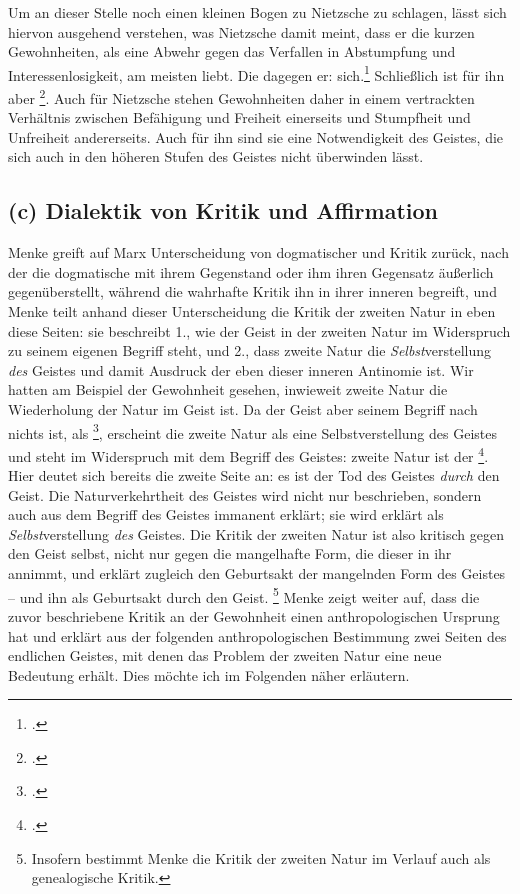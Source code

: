 \documentclass[12pt, a4paper, openany]{report}
\begin{document}
Um an dieser Stelle noch einen kleinen Bogen zu Nietzsche zu schlagen, lässt sich hiervon ausgehend verstehen, was Nietzsche damit meint, dass er die kurzen Gewohnheiten, als eine Abwehr gegen das Verfallen in Abstumpfung und Interessenlosigkeit, am meisten liebt.
Die  dagegen  er:  sich.\footcite[][535]{nietzsche_morgenrote_1999}
Schließlich ist für ihn  aber \footcite[][535]{nietzsche_morgenrote_1999}.
Auch für Nietzsche stehen Gewohnheiten daher in einem vertrackten Verhältnis zwischen Befähigung und Freiheit einerseits und Stumpfheit und Unfreiheit andererseits. 
Auch für ihn sind sie eine Notwendigkeit des Geistes, die sich auch in den höheren Stufen des Geistes nicht überwinden lässt. 

\subsection{(c) Dialektik von Kritik und Affirmation}\label{kritik_affirmation}
Menke greift auf Marx Unterscheidung von dogmatischer und  Kritik zurück, nach der die dogmatische mit ihrem Gegenstand  oder ihm ihren Gegensatz äußerlich gegenüberstellt, während die wahrhafte Kritik ihn in ihrer inneren  begreift, und Menke teilt anhand dieser Unterscheidung die Kritik der zweiten Natur in eben diese Seiten:
sie beschreibt 1., wie der Geist in der zweiten Natur im Widerspruch zu seinem eigenen Begriff steht, und 2., dass zweite Natur die \emph{Selbst}verstellung \emph{des} Geistes und damit Ausdruck der eben dieser inneren Antinomie ist.
Wir hatten am Beispiel der Gewohnheit gesehen, inwieweit zweite Natur die Wiederholung der Natur im Geist ist. 
Da der Geist aber seinem Begriff nach nichts ist, als \footcite[][137]{menke_autonomie_2018}, erscheint die zweite Natur als eine Selbstverstellung des Geistes und steht im Widerspruch mit dem Begriff des Geistes:
zweite Natur ist der \footcite[][43]{menke_autonomie_2018}.
Hier deutet sich bereits die zweite Seite an:
es ist der Tod des Geistes \emph{durch} den Geist.
Die Naturverkehrtheit des Geistes wird nicht nur beschrieben, sondern auch aus dem Begriff des Geistes immanent erklärt;
sie wird erklärt als \emph{Selbst}verstellung \emph{des} Geistes. 
Die Kritik der zweiten Natur ist also kritisch gegen den Geist selbst, nicht nur gegen die mangelhafte Form, die dieser in ihr annimmt, und erklärt zugleich den Geburtsakt der mangelnden Form des Geistes -- und ihn als Geburtsakt durch den Geist.%
\footnote{
    Insofern bestimmt Menke die Kritik der zweiten Natur im Verlauf auch als genealogische Kritik.
}
Menke zeigt weiter auf, dass die zuvor beschriebene Kritik an der Gewohnheit einen anthropologischen Ursprung hat und erklärt aus der folgenden anthropologischen Bestimmung zwei Seiten des endlichen Geistes, mit denen das Problem der zweiten Natur eine neue Bedeutung erhält.
Dies möchte ich im Folgenden näher erläutern.\\
\end{document}
